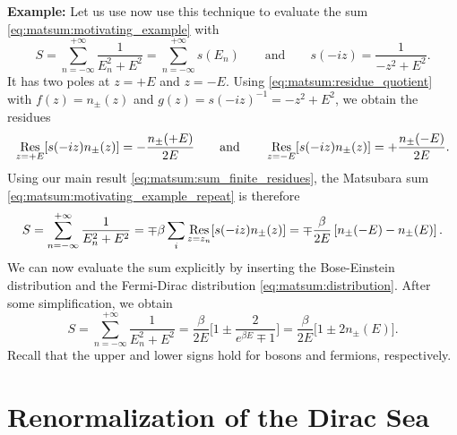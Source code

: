 \textbf{Example:}
Let us use now use this technique to evaluate the sum \eqref{eq:matsum:motivating_example} with
\begin{equation}
	S = \sum_{n=-\infty}^{+\infty} \frac{1}{E_n^2 + E^2}
	  = \sum_{n=-\infty}^{+\infty} s(E_n)
	\qquad \text{and} \qquad
	s(-iz) = \frac{1}{-z^2 + E^2} .
\label{eq:matsum:motivating_example_repeat}
\end{equation}
It has two poles at $z = +E$ and $z = -E$.
Using \cref{eq:matsum:residue_quotient} with $f(z) = n_\pm(z)$ and $g(z) = s(-iz)^{-1} = -z^2 + E^2$, we obtain the residues
\begin{equation}
	\operatorname*{Res}_{z = +E}[s(-iz) n_\pm(z)] = -\frac{n_\pm(+E)}{2 E}  
	\qquad \text{and} \qquad
	\operatorname*{Res}_{z = -E}[s(-iz) n_\pm(z)] = +\frac{n_\pm(-E)}{2 E}  .
\end{equation}
Using our main result \eqref{eq:matsum:sum_finite_residues}, the Matsubara sum \eqref{eq:matsum:motivating_example_repeat} is therefore
\begin{equation}
	S = \sum_{n=-\infty}^{+\infty} \frac{1}{E_n^2 + E^2}
	  = \mp \beta \sum_i \operatorname*{Res}_{z=z_n}[s(-i z) n_\pm(z)]
	  = \mp \frac{\beta}{2 E} \left[ n_\pm(-E) - n_\pm(E) \right] .
\end{equation}
We can now evaluate the sum explicitly by inserting the Bose-Einstein distribution and the Fermi-Dirac distribution \eqref{eq:matsum:distribution}.
After some simplification, we obtain
\begin{equation}
	S = \sum_{n=-\infty}^{+\infty} \frac{1}{E_n^2 + E^2}
	  = \frac{\beta}{2 E} \bigg[ 1 \pm \frac{2}{e^{\beta E} \mp 1} \bigg]
	  = \frac{\beta}{2 E} \bigg[ 1 \pm 2 n_\pm(E) \bigg] .
\label{eq:matsum:example_result}
\end{equation}
Recall that the upper and lower signs hold for bosons and fermions, respectively.


\chapter{Renormalization of the Dirac Sea}
\label{chap:diracsea}

